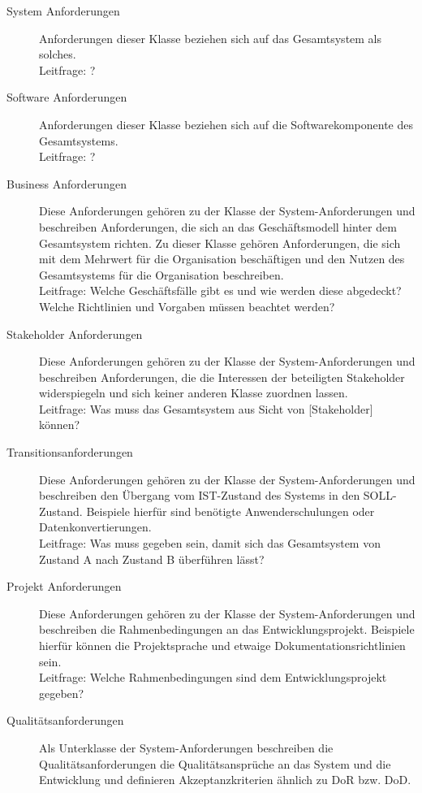 \begin{description}
  \item[System Anforderungen] Anforderungen dieser Klasse beziehen sich auf das Gesamtsystem als solches.\\
  Leitfrage: \glqq ? \grqq
  \item[Software Anforderungen] Anforderungen dieser Klasse beziehen sich auf die Softwarekomponente des Gesamtsystems.\\
  Leitfrage: \glqq ? \grqq
  \item[Business Anforderungen] Diese Anforderungen gehören zu der Klasse der System-Anforderungen und beschreiben Anforderungen, die sich an das Geschäftsmodell hinter dem Gesamtsystem richten. Zu dieser Klasse gehören Anforderungen, die sich mit dem Mehrwert für die Organisation beschäftigen und den Nutzen des Gesamtsystems für die Organisation beschreiben.\\
  Leitfrage: \glqq Welche Geschäftsfälle gibt es und wie werden diese abgedeckt? Welche Richtlinien und Vorgaben müssen beachtet werden? \grqq
  \item[Stakeholder Anforderungen] Diese Anforderungen gehören zu der Klasse der System-Anforderungen und beschreiben Anforderungen, die die Interessen der beteiligten Stakeholder widerspiegeln und sich keiner anderen Klasse zuordnen lassen.\\
  Leitfrage: \glqq Was muss das Gesamtsystem aus Sicht von [Stakeholder] können? \grqq
  \item[Transitionsanforderungen] Diese Anforderungen gehören zu der Klasse der System-Anforderungen und beschreiben den Übergang vom IST-Zustand des Systems in den SOLL-Zustand. Beispiele hierfür sind benötigte Anwenderschulungen oder Datenkonvertierungen.\\
  Leitfrage: \glqq Was muss gegeben sein, damit sich das Gesamtsystem von Zustand A nach Zustand B überführen lässt? \grqq
  \item[Projekt Anforderungen] Diese Anforderungen gehören zu der Klasse der System-Anforderungen und beschreiben die Rahmenbedingungen an das Entwicklungsprojekt. Beispiele hierfür können die Projektsprache und etwaige Dokumentationsrichtlinien sein.\\
  Leitfrage: \glqq Welche Rahmenbedingungen sind dem Entwicklungsprojekt gegeben? \grqq
  \item[Qualitätsanforderungen] Als Unterklasse der System-Anforderungen beschreiben die Qualitätsanforderungen die Qualitätsansprüche an das System und die Entwicklung und definieren Akzeptanzkriterien ähnlich zu  \ac{DoR} bzw. \ac{DoD}.\\

\end{description}

